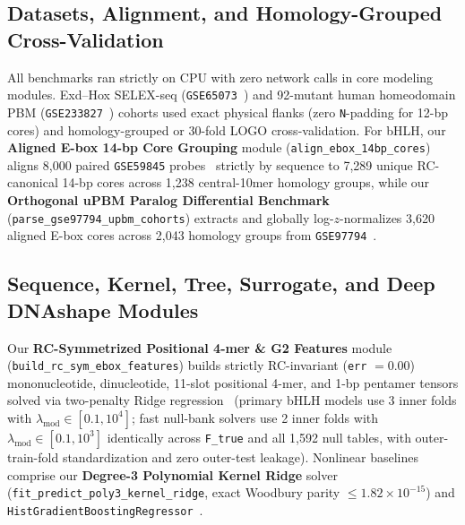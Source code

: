 \documentclass[11pt,a4paper]{article}
\begin{document}
\subsection{Datasets, Alignment, and Homology-Grouped Cross-Validation}
All benchmarks ran strictly on CPU with zero network calls in core modeling modules. Exd--Hox SELEX-seq (\texttt{GSE65073}~\cite{slattery2011cell,abe2015cell}) and 92-mutant human homeodomain PBM (\texttt{GSE233827}~\cite{kock2024natcomm}) cohorts used exact physical flanks (zero \texttt{N}-padding for 12-bp cores) and homology-grouped or 30-fold LOGO cross-validation. For bHLH, our \textbf{Aligned E-box 14-bp Core Grouping} module (\texttt{align\_ebox\_14bp\_cores}) aligns 8,000 paired \texttt{GSE59845} probes~\cite{gordan2013cellrep} strictly by sequence to 7,289 unique RC-canonical 14-bp cores across 1,238 central-10mer homology groups, while our \textbf{Orthogonal uPBM Paralog Differential Benchmark} (\texttt{parse\_gse97794\_upbm\_cohorts}) extracts and globally log-$z$-normalizes 3,620 aligned E-box cores across 2,043 homology groups from \texttt{GSE97794}~\cite{shen2018cels}.

\subsection{Sequence, Kernel, Tree, Surrogate, and Deep DNAshape Modules}
Our \textbf{RC-Symmetrized Positional 4-mer \& G2 Features} module (\texttt{build\_rc\_sym\_ebox\_features}) builds strictly RC-invariant (\texttt{err} $= 0.00$) mononucleotide, dinucleotide, 11-slot positional 4-mer, and 1-bp pentamer tensors solved via two-penalty Ridge regression~\cite{hoerl1970tech} (primary bHLH models use 3 inner folds with $\lambda_{\mathrm{mod}} \in [0.1, 10^4]$; fast null-bank solvers use 2 inner folds with $\lambda_{\mathrm{mod}} \in [0.1, 10^3]$ identically across \texttt{F\_true} and all 1,592 null tables, with outer-train-fold standardization and zero outer-test leakage). Nonlinear baselines comprise our \textbf{Degree-3 Polynomial Kernel Ridge} solver (\texttt{fit\_predict\_poly3\_kernel\_ridge}, exact Woodbury parity $\le 1.82\times 10^{-15}$) and \texttt{HistGradientBoostingRegressor}~\cite{friedman2001aos,ke2017lightgbm,pedregosa2011jmlr}.
\end{document}
